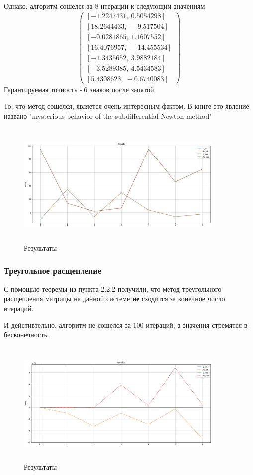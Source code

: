 \documentclass{article}
\begin{document}
    Однако, алгоритм сошелся за 8 итерации к следующим значениям 
    \begin{equation*}
        \begin{pmatrix}
             [ -1.2247431, \ 0.5054298] \\
             [ 18.2644433, \  -9.517504] \\
             [ -0.0281865, \ 1.1607552] \\
             [ 16.4076957, \ -14.455534] \\
             [ -1.3435652, \ 3.9882184] \\
             [ -3.5289385, \ 4.5434583] \\
             [  5.4308623, \ -0.6740083]
        \end{pmatrix}
    \end{equation*}
    Гарантируемая точность - 6 знаков после запятой.
    
    То, что метод сошелся, является очень интересным фактом. В книге \cite{litlink3} это явление названо "mysterious behavior of the subdifferential Newton method"
     \begin{figure}[H]
        \centering
        \includegraphics[width=10cm, height=6cm]{1.png}
        \caption{Результаты}
    \end{figure}
    
    
    \subsubsection{Треугольное расщепление}
    С помощью теоремы из пункта 2.2.2 получили, что метод треугольного расщепления матрицы на данной системе \textbf{не} сходится за конечное число итераций.
    
    И дейстивтельно, алгоритм не сошелся за 100 итераций, а значения стремятся в бесконечность.
    \begin{figure}[H]
        \centering
        \includegraphics[width=10cm, height=6cm]{2.png}
        \caption{Результаты}
    \end{figure}
    
\end{document}

